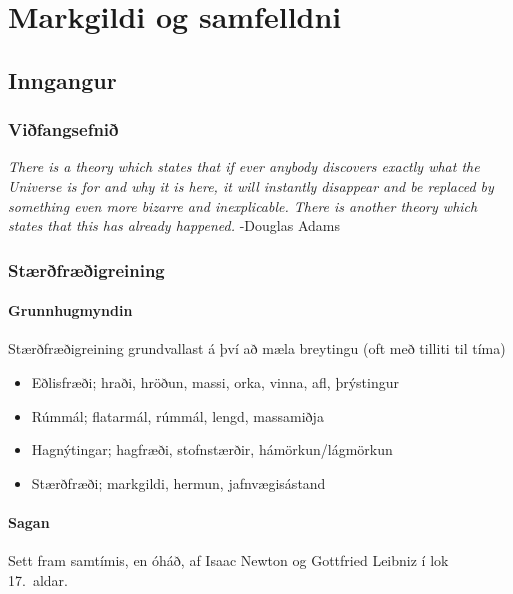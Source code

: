 \documentclass[icelandic,a4paper,12pt]{article}
\date{29. ágúst 2015}
\begin{document}
\maketitle

\section*{Markgildi og samfelldni}
\subsection*{Inngangur}
\subsubsection*{Viðfangsefnið}

\emph{There is a theory which states that if ever anybody discovers exactly what the Universe is for and 
  why it is here, it will instantly disappear and be replaced by something even more bizarre and inexplicable. 
  There is another theory which states that this has already happened.} \hfill -Douglas Adams
 



\subsubsection*{Stærðfræðigreining}

\paragraph{Grunnhugmyndin}

 Stærðfræðigreining grundvallast á því að mæla breytingu (oft með tilliti til tíma)
 \begin{itemize}
  \item Eðlisfræði; hraði, hröðun, massi, orka, vinna, afl, þrýstingur
  \item Rúmmál; flatarmál, rúmmál, lengd, massamiðja
  \item Hagnýtingar; hagfræði, stofnstærðir, hámörkun/lágmörkun 
  \item Stærðfræði; markgildi, hermun, jafnvægisástand
 \end{itemize}
  

\pause


\paragraph{Sagan}
 Sett fram samtímis, en óháð, af Isaac Newton og Gottfried Leibniz í lok 17.~aldar.
\end{document}
